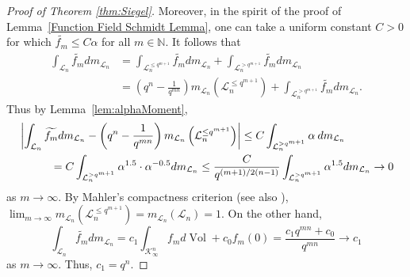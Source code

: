 \documentclass[11pt,a4paper,reqno]{amsart}
\theoremstyle{definition}
\theoremstyle{remark}
\numberwithin{equation}{section}
\begin{document}
\begin{proof}[Proof of Theorem \ref{thm:Siegel}]
Moreover, in the spirit of the proof of Lemma~\ref{Function Field Schmidt Lemma}, one can take a uniform constant $C>0$ for which $\widetilde{f_m}\le C\alpha$ for all $m\in \mathbb N$. It follows that
\[\begin{split}
\int_{\mathcal L_n} \widetilde{f_m} dm_{\mathcal L_n}
&=
\int_{\mathcal L_n^{\le q^{m+1}}} \widetilde{f_m} dm_{\mathcal L_n}+\int_{\mathcal L_n^{> q^{m+1}}} \widetilde{f_m} dm_{\mathcal L_n}\\
&=
\left(q^n-\frac 1{q^{mn}}\right) m_{\mathcal L_n}\left(\mathcal L_n^{\le q^{m+1}}\right)+\int_{\mathcal L_n^{> q^{m+1}}} \widetilde{f_m} dm_{\mathcal L_n}.
\end{split}\]
Thus by Lemma~\ref{lem:alphaMoment},
\[\begin{split}
&\left|\int_{\mathcal L_n} \widetilde{f_m} dm_{\mathcal L_n} - \left(q^n-\frac 1{q^{mn}}\right) m_{\mathcal L_n}\left(\mathcal L_n^{\le q^{m+1}}\right)\right|
\le
C\int_{\mathcal L_n^{> q^{m+1}}} \alpha\: dm_{\mathcal L_n}\\
&\hspace{0.4in}=
C\int_{\mathcal L_n^{> q^{m+1}}} \alpha^{1.5}\cdot \alpha^{-0.5} dm_{\mathcal L_n}
\le \frac {C}{q^{(m+1)/2(n-1)}} \int_{\mathcal L_n^{> q^{m+1}}} \alpha^{1.5} dm_{\mathcal L_n}
\rightarrow 0
\end{split}\]
as $m\rightarrow \infty$. 
By Mahler's compactness criterion \cite[Theorem 1.1]{KST} (see also \cite{Mah}), $\lim_{m\rightarrow \infty}m_{\mathcal L_n}\left(\mathcal L_n^{\le q^{m+1}}\right)=m_{\mathcal L_n}(\mathcal L_n)=1$.
On the other hand,
$$\int_{\mathcal L_n} \widetilde{f_m} dm_{\mathcal L_n} =
c_1\int_{\mathcal{K}_{\infty}^n}f_md\operatorname{Vol}+c_0f_m(0)=\frac{c_1q^{mn}+c_0}{q^{mn}}\rightarrow c_1$$
as $m\rightarrow \infty$. Thus, $c_1=q^n$. 


\end{proof}
\end{document}
